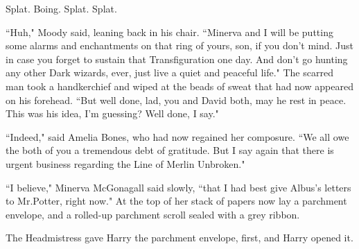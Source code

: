Splat. Boing. Splat. Splat.

``Huh," Moody said, leaning back in his chair. ``Minerva and I will be putting some alarms and enchantments on that ring of yours, son, if you don't mind. Just in case you forget to sustain that Transfiguration one day. And don't go hunting any other Dark wizards, ever, just live a quiet and peaceful life." The scarred man took a handkerchief and wiped at the beads of sweat that had now appeared on his forehead. ``But well done, lad, you and David both, may he rest in peace. This was his idea, I'm guessing? Well done, I say."

``Indeed," said Amelia Bones, who had now regained her composure. ``We all owe the both of you a tremendous debt of gratitude. But I say again that there is urgent business regarding the Line of Merlin Unbroken."

``I believe," Minerva McGonagall said slowly, ``that I had best give Albus's letters to Mr.\?Potter, right now." At the top of her stack of papers now lay a parchment envelope, and a rolled-up parchment scroll sealed with a grey ribbon.

The Headmistress gave Harry the parchment envelope, first, and Harry opened it.

\later

